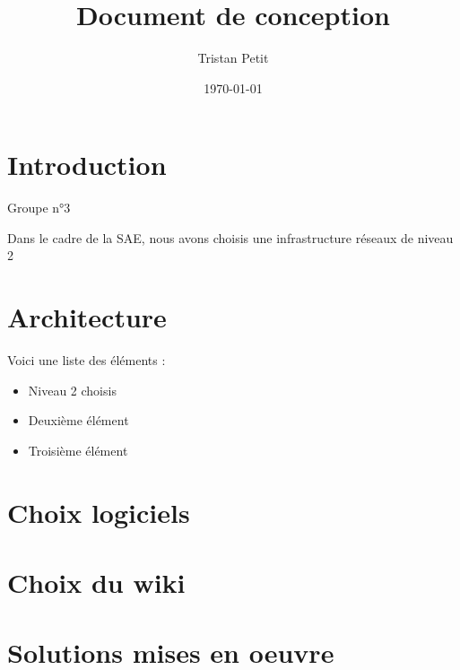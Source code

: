 \documentclass{report}
\begin{document}
\title{Document de conception}
\author{Tristan Petit}
\date{\today}
\maketitle

\section{Introduction}
Groupe n°3

Dans le cadre de la SAE, nous avons choisis une infrastructure réseaux 
de niveau 2

\section{Architecture}
Voici une liste des éléments :
\begin{itemize}
    \item Niveau 2 choisis
    \item Deuxième élément
    \item Troisième élément
\end{itemize}

\section{Choix logiciels}


\section{Choix du wiki}


\section{Solutions mises en oeuvre}
\end{document}
